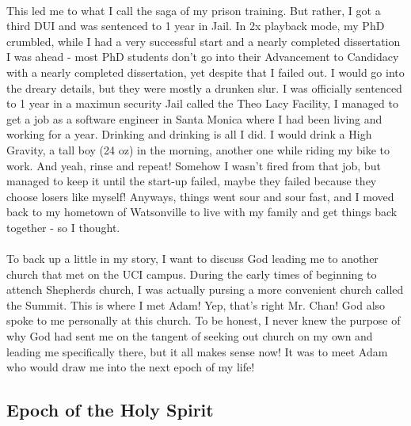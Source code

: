 \documentclass[a4paper]{article}
\begin{document}
\paragraph{}
This led me to what I call the saga of my prison training. But rather, I got a third DUI and was sentenced
to 1 year in Jail. In 2x playback mode, my PhD crumbled, while I had a very successful start and a nearly
completed dissertation I was ahead - most PhD students don't go into their Advancement to Candidacy with a
nearly completed dissertation, yet despite that I failed out. I would go into the dreary details, but they
were mostly a drunken slur. I was officially sentenced to 1 year in a maximun security Jail called the Theo
Lacy Facility, I managed to get a job as a software engineer in Santa Monica where I had been living and
working for a year. Drinking and drinking is all I did. I would drink a High Gravity, a tall boy (24 oz) in
the morning, another one while riding my bike to work. And yeah, rinse and repeat! Somehow I wasn't fired
from that job, but managed to keep it until the start-up failed, maybe they failed because they choose
losers like myself! Anyways, things went sour and sour fast, and I moved back to my hometown of Watsonville
to live with my family and get things back together - so I thought.

\paragraph{}
To back up a little in my story, I want to discuss God leading me to another church that met on the UCI campus.
During the early times of beginning to attench Shepherds church, I was actually pursing a more convenient
church called the Summit. This is where I met Adam! Yep, that's right Mr. Chan! God also spoke to me
personally at this church. To be honest, I never knew the purpose of why God had sent me on the tangent of
seeking out church on my own and leading me specifically there, but it all makes sense now! It was to meet
Adam who would draw me into the next epoch of my life!


\subsection{Epoch of the Holy Spirit}
\label{sec:orgfe4f4d5}
\end{document}
